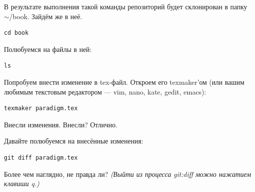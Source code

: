 \documentclass[11pt]{article}
\theoremstyle{remark}
\theoremstyle{definition}
\begin{document}
В результате выполнения такой команды репозиторий будет склонирован в папку $\sim$/book. Зайдём же в неё.  \begin{verbatim}cd book\end{verbatim}

Полюбуемся на файлы в ней:\begin{verbatim}ls\end{verbatim}

Попробуем внести изменение в tex-файл. Откроем его texmaker'ом (или вашим любимым текстовым редактором --- vim, nano, kate, gedit, emacs):\begin{verbatim}texmaker paradigm.tex\end{verbatim}

Внесли изменения. Внесли? Отлично.

Давайте полюбуемся на внесённые изменения:

\begin{verbatim}git diff paradigm.tex\end{verbatim}

Более чем наглядно, не правда ли? \textit{(Выйти из процесса git:diff можно нажатием клавиши q.)}

\end{document}

